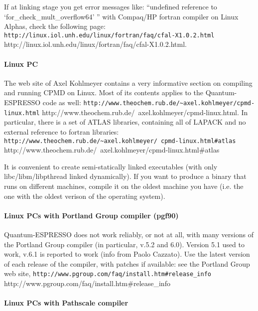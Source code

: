 \documentclass[12pt,a4paper]{article}
\begin{document}
If at linking stage you get error messages like: ``undefined reference
to `for\_check\_mult\_overflow64' '' with Compaq/HP fortran compiler
on Linux Alphas, check the following page:
\htmladdnormallink%
{\texttt{http://linux.iol.unh.edu/linux/fortran/faq/cfal-X1.0.2.html}}%
{http://linux.iol.unh.edu/linux/fortran/faq/cfal-X1.0.2.html}.

\paragraph{Linux PC}

The web site of Axel Kohlmeyer contains a very informative section 
on compiling and running CPMD on Linux.
Most of its contents applies to the Quantum-ESPRESSO code as well:\hfill\break
\htmladdnormallink%
{\texttt{http://www.theochem.rub.de/\~{}axel.kohlmeyer/cpmd-linux.html}}%
{http://www.theochem.rub.de/~axel.kohlmeyer/cpmd-linux.html}.
In particular, there is a set of ATLAS libraries, containing 
all of LAPACK and no external reference to fortran libraries:\hfill\break
\htmladdnormallink%
{{\small\texttt{http://www.theochem.rub.de/\~{}axel.kohlmeyer/%
                cpmd-linux.html\#atlas}}}%
{http://www.theochem.rub.de/~axel.kohlmeyer/cpmd-linux.html\#atlas}

It is convenient to create semi-statically linked executables
(with only libc/libm/libpthread linked dynamically). If you want
to produce a binary that runs on different machines, compile it
on the oldest machine you have (i.e. the one with the oldest verison
of the operating system).

\paragraph{Linux PCs with Portland Group compiler (pgf90)}

\hfill\break
Quantum-ESPRESSO does not work reliably, or not at all, with many
versions of the Portland Group compiler (in particular, v.5.2
and 6.0). Version 5.1 used to work, v.6.1 is reported to work
(info from Paolo Cazzato). Use the latest version of each release 
of the compiler, with patches if available: see the Portland Group 
web site,\hfill\break
\htmladdnormallink%
{\texttt{http://www.pgroup.com/faq/install.htm\#release\_info}}%
{http://www.pgroup.com/faq/install.htm\#release\_info}

\paragraph{Linux PCs with Pathscale compiler}
\end{document}
